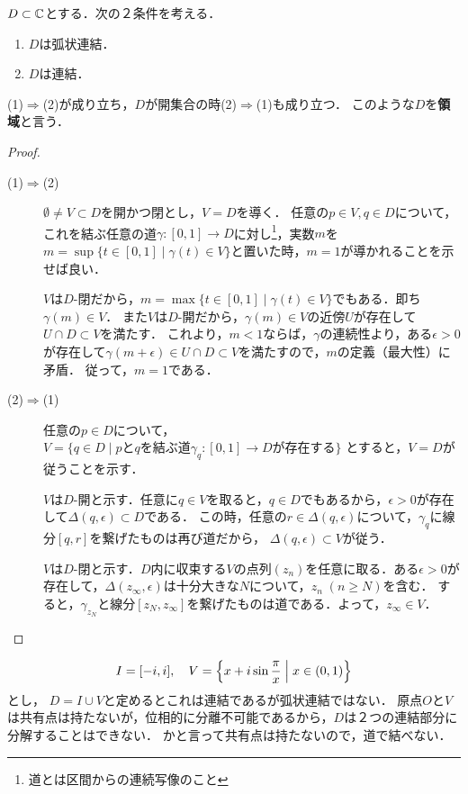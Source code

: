 \documentclass[uplatex, dvipdfmx]{jsreport}
\begin{document}
\begin{lemma}
    $D\subset\mathbb{C}$とする．次の２条件を考える．
    \begin{enumerate}[(1)]
        \item $D$は弧状連結．
        \item $D$は連結．
    \end{enumerate}
    (1)$\Rightarrow$(2)が成り立ち，$D$が開集合の時(2)$\Rightarrow$(1)も成り立つ．
    このような$D$を\textbf{領域}と言う．
\end{lemma}
\begin{proof}\mbox{}
    \begin{description}
        \item[(1)$\Rightarrow$(2)] 
        $\emptyset\ne V\subset D$を開かつ閉とし，$V=D$を導く．
        任意の$p\in V,q\in D$について，これを結ぶ任意の道$\gamma:[0,1]\to D$に対し\footnote{道とは区間からの連続写像のこと}，実数$m$を$m=\sup\{t\in[0,1]\mid\gamma(t)\in V\}$と置いた時，$m=1$が導かれることを示せば良い．

        $V$は$D$-閉だから，$m=\max\{t\in[0,1]\mid\gamma(t)\in V\}$でもある．即ち$\gamma(m)\in V$．
        また$V$は$D$-開だから，$\gamma(m)\in V$の近傍$U$が存在して$U\cap D\subset V$を満たす．
        これより，$m<1$ならば，$\gamma$の連続性より，ある$\epsilon>0$が存在して$\gamma(m+\epsilon)\in U\cap D\subset V$を満たすので，$m$の定義（最大性）に矛盾．
        従って，$m=1$である．
        \item[(2)$\Rightarrow$(1)] 
        任意の$p\in D$について，$V=\{q\in D\mid pとqを結ぶ道\gamma_q:[0,1]\to Dが存在する\}$
        とすると，$V=D$が従うことを示す．

        $V$は$D$-開と示す．任意に$q\in V$を取ると，$q\in D$でもあるから，$\epsilon>0$が存在して$\Delta(q,\epsilon)\subset D$である．
        この時，任意の$r\in\Delta(q,\epsilon)$について，$\gamma_q$に線分$[q,r]$を繋げたものは再び道だから，
        $\Delta(q,\epsilon)\subset V$が従う．

        $V$は$D$-閉と示す．$D$内に収束する$V$の点列$(z_n)$を任意に取る．ある$\epsilon>0$が存在して，$\Delta(z_\infty,\epsilon)$は十分大きな$N$について，$z_n\;(n\ge N)$を含む．
        すると，$\gamma_{z_N}$と線分$[z_N,z_\infty]$を繋げたものは道である．よって，$z_\infty\in V$．
    \end{description}
\end{proof}

\begin{example}[位相幾何学者の正弦曲線]
    \[I=[-i,i],\quad
    V=\left\{
        x+i\sin\frac{\pi}{x}\;\middle|\;x\in (0,1)
    \right\}\]
    とし，
    $D=I\cup V$と定めるとこれは連結であるが弧状連結ではない．
    原点$O$と$V$は共有点は持たないが，位相的に分離不可能であるから，$D$は２つの連結部分に分解することはできない．
    かと言って共有点は持たないので，道で結べない．
\end{example}
\end{document}

